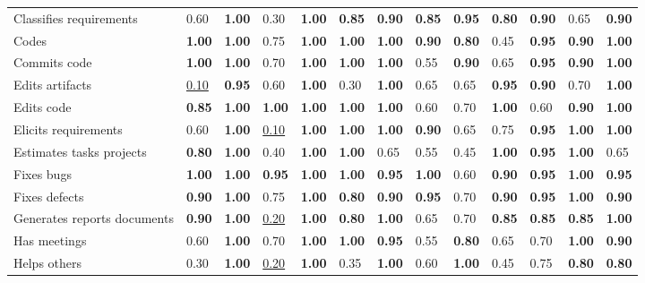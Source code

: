 \begin{tabular}{lllllllllllll}
Classifies requirements & 0.60 & \textbf{1.00} & 0.30 & \textbf{1.00} & \textbf{0.85} & \textbf{0.90} & \textbf{0.85} & \textbf{0.95} & \textbf{0.80} & \textbf{0.90} & 0.65 & \textbf{0.90} \\
Codes & \textbf{1.00} & \textbf{1.00} & 0.75 & \textbf{1.00} & \textbf{1.00} & \textbf{1.00} & \textbf{0.90} & \textbf{0.80} & 0.45 & \textbf{0.95} & \textbf{0.90} & \textbf{1.00} \\
Commits code & \textbf{1.00} & \textbf{1.00} & 0.70 & \textbf{1.00} & \textbf{1.00} & \textbf{1.00} & 0.55 & \textbf{0.90} & 0.65 & \textbf{0.95} & \textbf{0.90} & \textbf{1.00} \\
Edits artifacts & \underline{0.10} & \textbf{0.95} & 0.60 & \textbf{1.00} & 0.30 & \textbf{1.00} & 0.65 & 0.65 & \textbf{0.95} & \textbf{0.90} & 0.70 & \textbf{1.00} \\
Edits code & \textbf{0.85} & \textbf{1.00} & \textbf{1.00} & \textbf{1.00} & \textbf{1.00} & \textbf{1.00} & 0.60 & 0.70 & \textbf{1.00} & 0.60 & \textbf{0.90} & \textbf{1.00} \\
Elicits requirements & 0.60 & \textbf{1.00} & \underline{0.10} & \textbf{1.00} & \textbf{1.00} & \textbf{1.00} & \textbf{0.90} & 0.65 & 0.75 & \textbf{0.95} & \textbf{1.00} & \textbf{1.00} \\
Estimates tasks projects & \textbf{0.80} & \textbf{1.00} & 0.40 & \textbf{1.00} & \textbf{1.00} & 0.65 & 0.55 & 0.45 & \textbf{1.00} & \textbf{0.95} & \textbf{1.00} & 0.65 \\
Fixes bugs & \textbf{1.00} & \textbf{1.00} & \textbf{0.95} & \textbf{1.00} & \textbf{1.00} & \textbf{0.95} & \textbf{1.00} & 0.60 & \textbf{0.90} & \textbf{0.95} & \textbf{1.00} & \textbf{0.95} \\
Fixes defects & \textbf{0.90} & \textbf{1.00} & 0.75 & \textbf{1.00} & \textbf{0.80} & \textbf{0.90} & \textbf{0.95} & 0.70 & \textbf{0.90} & \textbf{0.95} & \textbf{1.00} & \textbf{0.90} \\
Generates reports documents & \textbf{0.90} & \textbf{1.00} & \underline{0.20} & \textbf{1.00} & \textbf{0.80} & \textbf{1.00} & 0.65 & 0.70 & \textbf{0.85} & \textbf{0.85} & \textbf{0.85} & \textbf{1.00} \\
Has meetings & 0.60 & \textbf{1.00} & 0.70 & \textbf{1.00} & \textbf{1.00} & \textbf{0.95} & 0.55 & \textbf{0.80} & 0.65 & 0.70 & \textbf{1.00} & \textbf{0.90} \\
Helps others & 0.30 & \textbf{1.00} & \underline{0.20} & \textbf{1.00} & 0.35 & \textbf{1.00} & 0.60 & \textbf{1.00} & 0.45 & 0.75 & \textbf{0.80} & \textbf{0.80} \\

\end{tabular}

